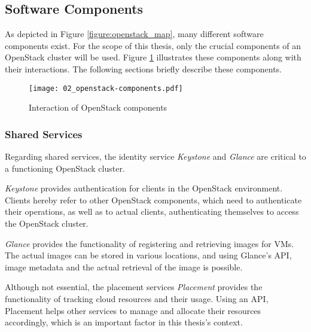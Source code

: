         \subsection{Software Components}
        \label{subsection:components}
            
            As depicted in Figure \ref{figure:openstack_map}, many different software components exist.
            For the scope of this thesis, only the crucial components of an OpenStack cluster will be used.
            Figure \ref{figure:openstack_components} illustrates these components along with their interactions.
            The following sections briefly describe these components.
            
            \begin{figure}[ht]
                \begin{center} 
                    \texttt{[image: 02\_openstack-components.pdf]} 
                    \caption[Interaction of OpenStack components]{Interaction of OpenStack components \cite{UnixArena2015}}
                    \label{figure:openstack_components}
                \end{center}	
             \end{figure}
             
             
             \subsubsection{Shared Services}
             
                Regarding shared services, the identity service \textsl{Keystone} and \textsl{Glance} are critical to a functioning OpenStack cluster.
                
                \noindent \textsl{Keystone} provides authentication for clients in the OpenStack environment. 
                Clients hereby refer to other OpenStack components, which need to authenticate their operations, as well as to actual clients, authenticating themselves to access the OpenStack cluster.
                
                \noindent \textsl{Glance} provides the functionality of registering and retrieving images for \acp{VM}.
                The actual images can be stored in various locations, and using Glance's \ac{API}, image metadata and the actual retrieval of the image is possible.
                
                \noindent Although not essential, the placement services \textsl{Placement} provides the functionality of tracking cloud resources and their usage.
                Using an API, Placement helps other services to manage and allocate their resources accordingly, which is an important factor in this thesis’s context. 
             
